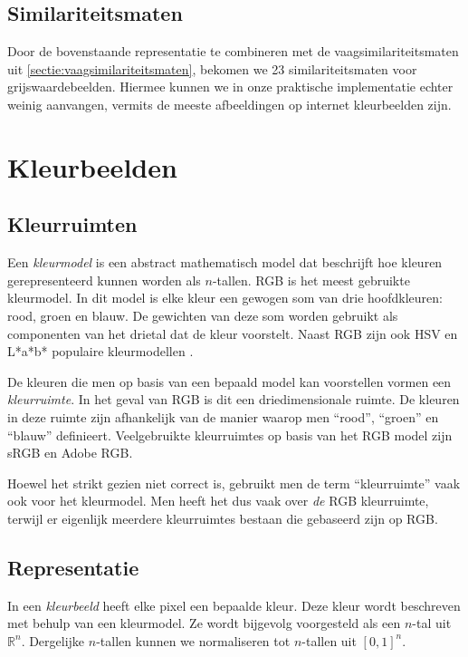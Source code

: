 \subsection{Similariteitsmaten}

Door de bovenstaande representatie te combineren met de vaagsimilariteitsmaten uit 
\ref{sectie:vaagsimilariteitsmaten}, bekomen we 23 similariteitsmaten voor grijswaardebeelden.
Hiermee kunnen we in onze praktische implementatie echter weinig aanvangen, vermits de
meeste afbeeldingen op internet kleurbeelden zijn. 


\section{Kleurbeelden}
\label{sectie:pixelgeb_kleurbeelden}

\subsection{Kleurruimten}

Een \emph{kleurmodel} is een abstract mathematisch model dat beschrijft hoe kleuren gerepresenteerd 
kunnen worden als $n$-tallen. RGB is het meest gebruikte kleurmodel. In dit model is elke kleur
een gewogen som van drie hoofdkleuren: rood, groen en blauw. De gewichten van deze som
worden gebruikt als componenten van het drietal dat de kleur voorstelt. Naast RGB zijn ook
HSV en L*a*b* populaire kleurmodellen \cite{phillips:beeldverwerking}.

De kleuren die men op basis van een bepaald model kan voorstellen vormen een \emph{kleurruimte}. 
In het geval van RGB is dit een driedimensionale ruimte. De kleuren in deze ruimte zijn afhankelijk
van de manier waarop men ``rood'', ``groen'' en ``blauw'' definieert. Veelgebruikte kleurruimtes 
op basis van het RGB model zijn sRGB en Adobe RGB.

Hoewel het strikt gezien niet correct is, gebruikt men de term ``kleurruimte'' vaak ook voor het
kleurmodel. Men heeft het dus vaak over \emph{de} RGB kleurruimte, terwijl er eigenlijk meerdere
kleurruimtes bestaan die gebaseerd zijn op RGB. 

\subsection{Representatie}

In een \emph{kleurbeeld} heeft elke pixel een bepaalde kleur. Deze kleur wordt beschreven met
behulp van een kleurmodel. Ze wordt bijgevolg voorgesteld als een $n$-tal uit
$\mathbb{R}^n$. Dergelijke $n$-tallen kunnen we normaliseren tot $n$-tallen uit $[0,1]^n$. 

